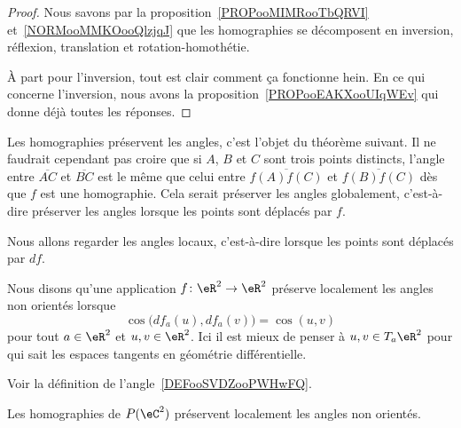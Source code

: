 \begin{proof}
	Nous savons par la proposition~\ref{PROPooMIMRooTbQRVI} et~\ref{NORMooMMKOooQlzjqJ} que les homographies se décomposent en inversion, réflexion, translation et rotation-homothétie.

	À part pour l'inversion, tout est clair comment ça fonctionne hein. En ce qui concerne l'inversion, nous avons la proposition~\ref{PROPooEAKXooUIqWEv} qui donne déjà toutes les réponses.

\end{proof}

\begin{normaltext}
	Les homographies préservent les angles, c'est l'objet du théorème suivant. Il ne faudrait cependant pas croire que si \( A\), \( B\) et \( C\) sont trois points distincts, l'angle entre \( \overline{ AC }\) et \( \overline{ BC }\) est le même que celui entre \( \overline{ f(A)f(C) }\) et \( \overline{ f(B)f(C) }\) dès que \( f\) est une homographie. Cela serait préserver les angles globalement, c'est-à-dire préserver les angles lorsque les points sont déplacés par \( f\).

	Nous allons regarder les angles locaux, c'est-à-dire lorsque les points sont déplacés par \( df\).
\end{normaltext}

\begin{definition}
	Nous disons qu'une application \( f\colon \eR^2\to \eR^2\) préserve localement les angles non orientés lorsque
	\begin{equation}
		\cos\big( df_a(u),df_a(v) \big)=\cos(u,v)
	\end{equation}
	pour tout \( a\in \eR^2\) et \( u,v\in \eR^2\). Ici il est mieux de penser à \( u,v\in T_a\eR^2\) pour qui sait les espaces tangents en géométrie différentielle.
\end{definition}
Voir la définition de l'angle~\ref{DEFooSVDZooPWHwFQ}.

\begin{theorem}
	Les homographies de \( P(\eC^2)\) préservent localement les angles non orientés.
\end{theorem}

